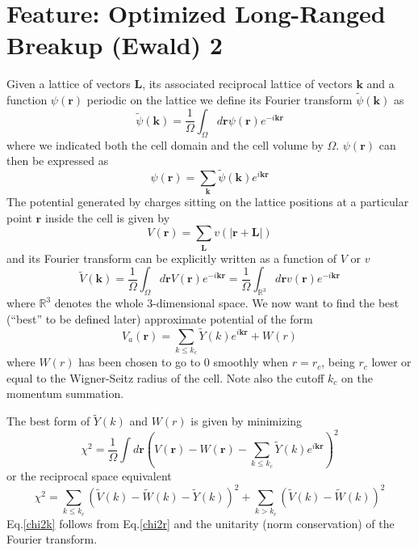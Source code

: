 \newpage
\section{Feature: Optimized Long-Ranged Breakup (Ewald) 2}


\newcommand{\rv}{\mathbf{r}}
\newcommand{\kv}{\mathbf{k}}
\newcommand{\Rv}{\mathbf{R}}
\newcommand{\Lv}{\mathbf{L}}
\newcommand{\Rc}{\mathcal{R}}
\newcommand{\tV}{\widetilde{V}}
\newcommand{\tW}{\widetilde{W}}
\newcommand{\tc}{\widetilde{c}}
\newcommand{\tY}{\widetilde{Y}}
\newcommand{\Nk}{N_\text{knot}}
\newcommand{\wk}{w_\text{knot}}

Given a lattice of vectors $\Lv$, its associated reciprocal
lattice of vectors $\kv$ and a function $\psi(\rv)$ periodic
on the lattice we define its Fourier transform $\widetilde{\psi}(\kv)$ as
\begin{equation}
\widetilde{\psi}(\kv)=\frac{1}{\Omega}\int_\Omega d\rv \psi(\rv) e^{-i\kv\rv}
\end{equation}
where we indicated both the cell domain and the cell volume by $\Omega$. 
$\psi(\rv)$ can then be expressed as
\begin{equation}
\psi(\rv)=\sum_{\kv} \widetilde{\psi}(\kv)e^{i\kv\rv}
\end{equation}
The potential generated by charges sitting on the lattice positions
at a particular point $\rv$ inside the cell is given by
\begin{equation}
V(\rv)=\sum_{\Lv}v(|\rv+\Lv|)
\end{equation}
and its Fourier transform can be explicitly written as a function of $V$ or $v$
\begin{equation}
\widetilde{V}(\kv)=\frac{1}{\Omega}\int_\Omega d\rv V(\rv) e^{-i\kv\rv}=
\frac{1}{\Omega}\int_{\mathbb{R}^3} d\rv v(\rv) e^{-i\kv\rv}
\end{equation}
where $\mathbb{R}^3$ denotes the whole 3-dimensional space.
We now want to find the best (``best'' to be defined later) approximate 
potential of the form
\begin{equation}
V_a(\rv)=\sum_{k\le k_c} \widetilde{Y}(k) e^{i\kv\rv} + W(r)
\end{equation}
where $W(r)$ has been chosen to go to $0$ smoothly when $r=r_c$, being
$r_c$ lower or equal to the Wigner-Seitz radius of the cell. Note also
the cutoff $k_c$ on the momentum summation.

The best form of $\widetilde{Y}(k)$ and $W(r)$ is given by minimizing
\begin{equation}
  \chi^2=\frac{1}{\Omega}\int d\rv \left(V(\rv)-W(\rv)-
  \sum_{k\le k_c}\widetilde{Y}(k)e^{i\kv\rv}\right)^2
  \label{chi2r}
\end{equation}
or the reciprocal space equivalent
\begin{equation}
  \chi^2=\sum_{k\le k_c}(\tV(k)-\tW(k)-\tY(k))^2+\sum_{k>k_c}(\tV(k)-\tW(k))^2
  \label{chi2k}
\end{equation}
Eq.\ref{chi2k} follows from Eq.\ref{chi2r} and the unitarity
(norm conservation) of the Fourier transform.

